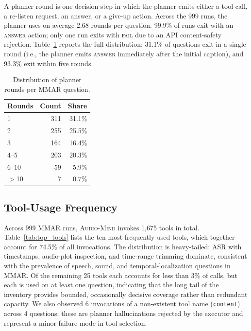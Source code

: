 \documentclass[11pt]{article}
\newcommand{\ours}{\textsc{Audio-Mind}}
\begin{document}
A planner round is one decision step in which the planner emits either a tool call, a re-listen request, an answer, or a give-up action. Across the 999 runs, the planner uses on average 2.68 rounds per question. 99.9\% of runs exit with an \textsc{answer} action; only one run exits with \textsc{fail} due to an API content-safety rejection. Table~\ref{tab:planner_rounds_hist} reports the full distribution: 31.1\% of questions exit in a single round (i.e., the planner emits \textsc{answer} immediately after the initial caption), and 93.3\% exit within five rounds.

\begin{table}[t]
\small
\centering
\begin{tabular}{lrr}
\toprule
\textbf{Rounds} & \textbf{Count} & \textbf{Share} \\
\midrule
1 & 311 & 31.1\% \\
2 & 255 & 25.5\% \\
3 & 164 & 16.4\% \\
4--5 & 203 & 20.3\% \\
6--10 & 59 & 5.9\% \\
$>$10 & 7 & 0.7\% \\
\bottomrule
\end{tabular}
\caption{Distribution of planner rounds per MMAR question.}
\label{tab:planner_rounds_hist}
\end{table}

\subsection{Tool-Usage Frequency}

Across 999 MMAR runs, \ours{} invokes 1{,}675 tools in total. Table~\ref{tab:top_tools} lists the ten most frequently used tools, which together account for 74.5\% of all invocations. The distribution is heavy-tailed: ASR with timestamps, audio-plot inspection, and time-range trimming dominate, consistent with the prevalence of speech, sound, and temporal-localization questions in MMAR. Of the remaining 25 tools each accounts for less than 3\% of calls, but each is used on at least one question, indicating that the long tail of the inventory provides bounded, occasionally decisive coverage rather than redundant capacity. We also observed 6 invocations of a non-existent tool name (\texttt{content}) across 4 questions; these are planner hallucinations rejected by the executor and represent a minor failure mode in tool selection.
\end{document}
